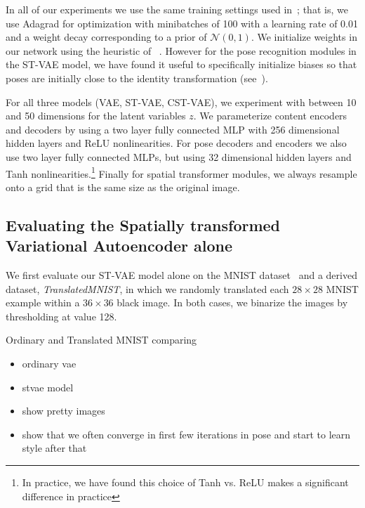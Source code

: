 
In all of our experiments we use the same training settings used in~\cite{Kingma2014}; that is,  
we use Adagrad for optimization with minibatches of 100  with a learning rate of 0.01
and a weight decay corresponding to a prior of $\mathcal{N}(0,1)$.
We initialize weights in our network using the heuristic of ~\cite{glorot2010understanding}.
However for the pose recognition modules in the ST-VAE model, we have found it useful to
specifically initialize biases so that poses are initially close to the identity transformation (see~\cite{jaderberg2015spatial}).

For all three models (VAE, ST-VAE, CST-VAE),
we experiment with between 10 and 50  dimensions for the latent variables $z$.
We parameterize content encoders and decoders
by using a two layer fully connected MLP with 256 dimensional
hidden layers and ReLU nonlinearities.
For pose decoders and encoders we also use two layer fully connected MLPs, but 
using 32 dimensional hidden layers and Tanh nonlinearities.\footnote{
In practice, we have found this choice of Tanh vs. ReLU makes a significant difference in practice}
Finally for spatial transformer modules, we always resample onto a grid that is the same size as the original
image.



\subsection{Evaluating the Spatially transformed Variational Autoencoder alone}

We first evaluate our ST-VAE model alone on the MNIST dataset~\citep{lecun1998gradient}
and a derived dataset, \emph{TranslatedMNIST}, in which we randomly translated each  $28\times 28$ MNIST example
within a $36\times 36$ black image.  In both cases, we binarize the images by thresholding at value 128.



Ordinary and Translated MNIST comparing
\begin{itemize}
\item ordinary vae
\item stvae model
\end{itemize}


\begin{itemize}
\item show pretty images
\item show that we often converge in first few iterations in pose and start to learn style after that
\end{itemize}



